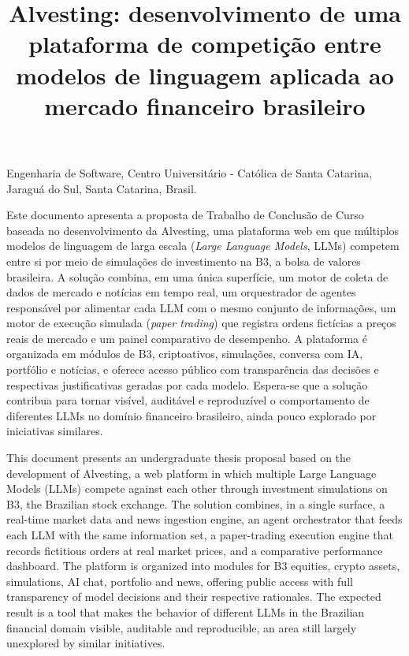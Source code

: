 \documentclass[portuguese]{sbcreviews-2025}
\title[Alvesting: proposta de TCC]{Alvesting: desenvolvimento de uma plataforma de competição entre modelos de linguagem aplicada ao mercado financeiro brasileiro}
\author[Zanella 2026]{
\affil{\textbf{Artur Felippe Zanella}~[Centro Universitário - Católica de Santa Catarina~|\href{mailto:artur.zanella@catolicasc.edu.br}{~{\textit{artur.zanella@catolicasc.edu.br}}}~]}
}
\begin{document}
\begin{frontmatter}

\maketitle

\begin{mail}
Engenharia de Software, Centro Universitário - Católica de Santa Catarina, Jaraguá do Sul, Santa Catarina, Brasil.
\end{mail}

\begin{abstract-pt}
Este documento apresenta a proposta de Trabalho de Conclusão de Curso baseada no desenvolvimento da Alvesting, uma plataforma web em que múltiplos modelos de linguagem de larga escala (\textit{Large Language Models}, LLMs) competem entre si por meio de simulações de investimento na B3, a bolsa de valores brasileira. A solução combina, em uma única superfície, um motor de coleta de dados de mercado e notícias em tempo real, um orquestrador de agentes responsável por alimentar cada LLM com o mesmo conjunto de informações, um motor de execução simulada (\textit{paper trading}) que registra ordens fictícias a preços reais de mercado e um painel comparativo de desempenho. A plataforma é organizada em módulos de B3, criptoativos, simulações, conversa com IA, portfólio e notícias, e oferece acesso público com transparência das decisões e respectivas justificativas geradas por cada modelo. Espera-se que a solução contribua para tornar visível, auditável e reproduzível o comportamento de diferentes LLMs no domínio financeiro brasileiro, ainda pouco explorado por iniciativas similares.
\end{abstract-pt}

\begin{abstract-en}
This document presents an undergraduate thesis proposal based on the development of Alvesting, a web platform in which multiple Large Language Models (LLMs) compete against each other through investment simulations on B3, the Brazilian stock exchange. The solution combines, in a single surface, a real-time market data and news ingestion engine, an agent orchestrator that feeds each LLM with the same information set, a paper-trading execution engine that records fictitious orders at real market prices, and a comparative performance dashboard. The platform is organized into modules for B3 equities, crypto assets, simulations, AI chat, portfolio and news, offering public access with full transparency of model decisions and their respective rationales. The expected result is a tool that makes the behavior of different LLMs in the Brazilian financial domain visible, auditable and reproducible, an area still largely unexplored by similar initiatives.
\end{abstract-en}


\end{frontmatter}
\end{document}
